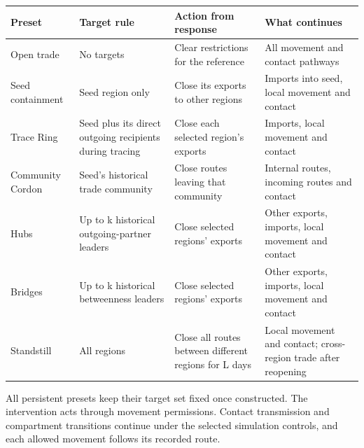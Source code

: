 \documentclass[11pt,a4paper]{article}
\begin{document}
\begin{longtable}[]{@{}
  >{\raggedright\arraybackslash}p{}
  >{\raggedright\arraybackslash}p{}
  >{\raggedright\arraybackslash}p{}
  >{\raggedright\arraybackslash}p{}@{}}
\toprule\noalign{}
\begin{minipage}[b]{\linewidth}\raggedright
Preset
\end{minipage} & \begin{minipage}[b]{\linewidth}\raggedright
Target rule
\end{minipage} & \begin{minipage}[b]{\linewidth}\raggedright
Action from response
\end{minipage} & \begin{minipage}[b]{\linewidth}\raggedright
What continues
\end{minipage} \\
\midrule\noalign{}
\endhead
\bottomrule\noalign{}
\endlastfoot
Open trade & No targets & Clear restrictions for the reference & All
movement and contact pathways \\
Seed containment & Seed region only & Close its exports to other regions
& Imports into seed, local movement and contact \\
Trace Ring & Seed plus its direct outgoing recipients during tracing &
Close each selected region's exports & Imports, local movement and
contact \\
Community Cordon & Seed's historical trade community & Close routes
leaving that community & Internal routes, incoming routes and contact \\
Hubs & Up to k historical outgoing-partner leaders & Close selected
regions' exports & Other exports, imports, local movement and contact \\
Bridges & Up to k historical betweenness leaders & Close selected
regions' exports & Other exports, imports, local movement and contact \\
Standstill & All regions & Close all routes between different regions
for L days & Local movement and contact; cross-region trade after
reopening \\
\end{longtable}

All persistent presets keep their target set fixed once constructed. The
intervention acts through movement permissions. Contact transmission and
compartment transitions continue under the selected simulation controls,
and each allowed movement follows its recorded route.
\end{document}

